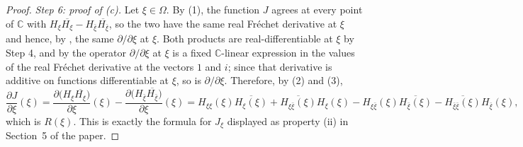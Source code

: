 \begin{proof}
\emph{Step 6: proof of (c).}  Let $\xi\in\Omega$.  By (1), the function $J$
agrees at every point of $\mathbb{C}$ with
$H_\xi\overline{H_\xi}-H_{\bar\xi}\overline{H_{\bar\xi}}$, so the two have the
same real Fr\'echet derivative at $\xi$ and hence, by , the same
$\partial/\partial\xi$ at $\xi$.  Both products are real-differentiable at
$\xi$ by Step 4, and by  the operator $\partial/\partial\xi$ at
$\xi$ is a fixed $\mathbb{C}$-linear expression in the values of the real
Fr\'echet derivative at the vectors $1$ and $i$; since that derivative is
additive on functions differentiable at $\xi$, so is $\partial/\partial\xi$.
Therefore, by (2) and (3),
\[
  \frac{\partial J}{\partial\xi}(\xi)
  =\frac{\partial\bigl(H_\xi\overline{H_\xi}\bigr)}{\partial\xi}(\xi)
   -\frac{\partial\bigl(H_{\bar\xi}\overline{H_{\bar\xi}}\bigr)}{\partial\xi}(\xi)
  =H_{\xi\xi}(\xi)\overline{H_\xi(\xi)}+\overline{H_{\xi\bar\xi}(\xi)}H_\xi(\xi)
   -H_{\xi\bar\xi}(\xi)\overline{H_{\bar\xi}(\xi)}
   -\overline{H_{\bar\xi\bar\xi}(\xi)}H_{\bar\xi}(\xi),
\]
which is $R(\xi)$.  This is exactly the formula for $J_\xi$ displayed as
property (ii) in Section~5 of the paper.
\end{proof}
